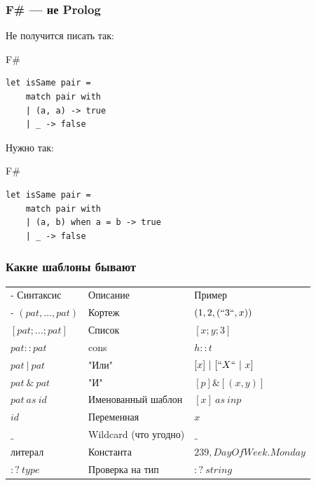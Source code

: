 \documentclass[xetex,mathserif,serif]{beamer}
\begin{document}
	\begin{frame}[fragile]
		\frametitle{F\# --- не Prolog}
		Не получится писать так:
		\begin{exampleblock}{F\#}
			\begin{verbatim}
let isSame pair =
    match pair with
    | (a, a) -> true
    | _ -> false
			\end{verbatim}
		\end{exampleblock}
		Нужно так:
		\begin{exampleblock}{F\#}
			\begin{verbatim}
let isSame pair =
    match pair with
    | (a, b) when a = b -> true
    | _ -> false
			\end{verbatim}
		\end{exampleblock}
\end{frame}

	\begin{frame}
		\frametitle{Какие шаблоны бывают}
		\begin{small}
			\begin{tabu} {| X[0.9 l p] | X[1 l p] | X[1 l p] |}
				\tabucline-
				Синтаксис                               & Описание                  & Пример                  \\
				\tabucline-
				\everyrow{\tabucline-}
				$(pat, \ldots, pat)$                    & Кортеж                    & $(1, 2, (``3``, x))$    \\
				$[pat; \ldots; pat]$                    & Список                    & $[x; y; 3]$             \\
				$pat :: pat$                            & cons                      & $h :: t$                \\
				$pat\ |\ pat$                           & "Или"                     & $[x]\ |\ [``X``\ |\ x]$ \\
				$pat\ \&\ pat$                          & "И"                       & $[p] \& [(x, y)]$       \\
				$pat\ as\ id$                           & Именованный шаблон        & $[x]\ as\ inp$          \\
				$id$                                    & Переменная                & $x$                     \\
				$\_$                                    & Wildcard (что угодно)     & $\_$                    \\
				литерал                                 & Константа                 & $239, DayOfWeek.Monday$ \\
				$:?\ type$                              & Проверка на тип           & $:?\ string$            \\
			\end{tabu}
		\end{small}
	\end{frame}
\end{document}

